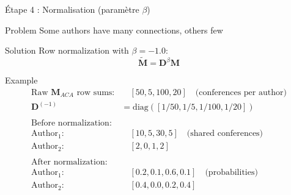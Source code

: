 \documentclass[9pt,aspectratio=169,professionalfonts]{beamer}
\begin{document}
\begin{frame}{Étape 4 : Normalisation (paramètre \(\beta\))}
\begin{alertblock}{Problem}
Some authors have many connections, others few
\end{alertblock}

\begin{block}{Solution}
Row normalization with $\beta = -1.0$:
$$\boxed{\tilde{\mathbf{M}} = \mathbf{D}^{\beta} \mathbf{M}}$$
\end{block}

\begin{exampleblock}{Example}
\begin{align*}
\text{Raw } \mathbf{M}_{ACA} \text{ row sums:} &\quad [50, 5, 100, 20] \quad \text{(conferences per author)} \\
\mathbf{D}^{(-1)} &= \text{diag}([1/50, 1/5, 1/100, 1/20]) \\
\\
\text{Before normalization:} \\
\text{Author}_1: &\quad [10, 5, 30, 5] \quad \text{(shared conferences)} \\
\text{Author}_2: &\quad [2, 0, 1, 2] \\
\\
\text{After normalization:} \\
\text{Author}_1: &\quad [0.2, 0.1, 0.6, 0.1] \quad \text{(probabilities)} \\
\text{Author}_2: &\quad [0.4, 0.0, 0.2, 0.4]
\end{align*}
\end{exampleblock}
\end{frame}
\end{document}
